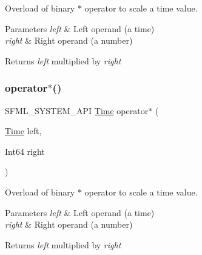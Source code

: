 Overload of binary $\ast$ operator to scale a time value. 


\begin{DoxyParams}{Parameters}
{\em left} & Left operand (a time) \\
\hline
{\em right} & Right operand (a number)\\
\hline
\end{DoxyParams}
\begin{DoxyReturn}{Returns}
{\itshape left} multiplied by {\itshape right} 
\end{DoxyReturn}
\mbox{\label{classsf_1_1_time_acd021b3ebb108053d7dec56869e27385}} 
\subsubsection{\texorpdfstring{operator$\ast$()}{operator*()}\hspace{0.1cm}{\footnotesize\ttfamily [2/4]}}
{\footnotesize\ttfamily S\+F\+M\+L\+\_\+\+S\+Y\+S\+T\+E\+M\+\_\+\+A\+PI \hyperlink{classsf_1_1_time}{Time} operator$\ast$ (\begin{DoxyParamCaption}\item[{\hyperlink{classsf_1_1_time}{Time}}]{left,  }\item[{Int64}]{right }\end{DoxyParamCaption})\hspace{0.3cm}{\ttfamily [related]}}



Overload of binary $\ast$ operator to scale a time value. 


\begin{DoxyParams}{Parameters}
{\em left} & Left operand (a time) \\
\hline
{\em right} & Right operand (a number)\\
\hline
\end{DoxyParams}
\begin{DoxyReturn}{Returns}
{\itshape left} multiplied by {\itshape right} 
\end{DoxyReturn}
\mbox{\label{classsf_1_1_time_a63723c9e9c5ff6151377ec4350c6f36e}} 
